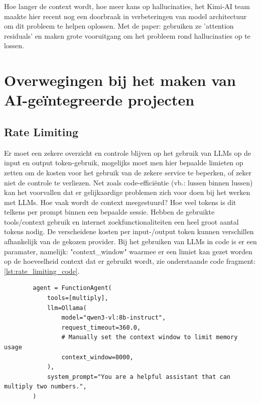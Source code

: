 Hoe langer de context wordt, hoe meer kans op hallucinaties, het Kimi-AI team maakte hier recent nog een doorbraak in verbeteringen van model architectuur om dit probleem te helpen oplossen. Met de paper: \autocite{Kimi2026} gebruiken ze 'attention residuals' en maken grote vooruitgang om het probleem rond hallucinaties op te lossen. 

\section{Overwegingen bij het maken van AI-geïntegreerde projecten}
\label{sec:overwegingenbijhetmakenvanaigeintegreerdeprojecten}

\subsection{Rate Limiting}
\label{ssec:ratelimiting}
Er moet een zekere overzicht en controle blijven op het gebruik van LLMs op de input en output token-gebruik, mogelijks moet men hier bepaalde limieten op zetten om de kosten voor het gebruik van de zekere service te beperken, of zeker niet de controle te verliezen. Net zoals code-efficiëntie (vb.: lussen binnen lussen) kan het voorvallen dat er gelijkaardige problemen zich voor doen bij het werken met LLMs. Hoe vaak wordt de context meegestuurd? Hoe veel tokens is dit telkens per prompt binnen een bepaalde sessie. Hebben de gebruikte tools/context gebruik en internet zoekfunctionaliteiten een heel groot aantal tokens nodig. De verscheidene kosten per input-/output token kunnen verschillen afhankelijk van de gekozen provider. Bij het gebruiken van LLMs in code is er een paramater, namelijk: "context\_window" waarmee er een limiet kan gezet worden op de hoeveelheid context dat er gebruikt wordt, zie onderstaande code fragment: \ref{lst:rate_limiting_code}.


\begin{listing}
    \begin{verbatim}
        agent = FunctionAgent(
            tools=[multiply],
            llm=Ollama(
                model="qwen3-vl:8b-instruct",
                request_timeout=360.0,
                # Manually set the context window to limit memory usage
                context_window=8000,
            ),
            system_prompt="You are a helpful assistant that can multiply two numbers.",
        )
    \end{verbatim}
    \caption[Rate Limiting voor LLMs]{Zelf de maximum context aanpassen, in essentie rate-limiting van LLM-tokengebruik.}
    \label{lst:rate_limiting_code}
\end{listing}

